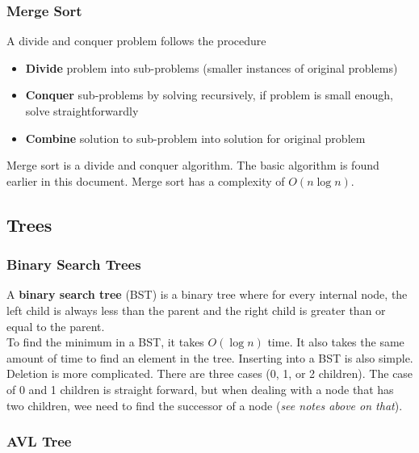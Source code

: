 \documentclass[]{article}
\begin{document}
\subsubsection{Merge Sort}\bigbreak

A divide and conquer problem follows the procedure

\begin{itemize}
	\item \textbf{Divide} problem into sub-problems (smaller instances of original problems)
	\item \textbf{Conquer} sub-problems by solving recursively, if problem is small enough, solve straightforwardly
	\item \textbf{Combine} solution to sub-problem into solution for original problem
\end{itemize}\bigbreak

Merge sort is a divide and conquer algorithm. The basic algorithm is found earlier in this document. Merge sort has a complexity of $O(n \log n).$\\


\subsection{Trees}\bigbreak

\subsubsection{Binary Search Trees}\bigbreak

A \textbf{binary search tree} (BST) is a binary tree where for every internal node, the left child is always less than the parent and the right child is greater than or equal to the parent.\\

To find the minimum in a BST, it takes $O(\log n)$ time. It also takes the same amount of time to find an element in the tree. Inserting into a BST is also simple. Deletion is more complicated. There are three cases (0, 1, or 2 children). The case of 0 and 1 children is straight forward, but when dealing with a node that has two children, wee need to find the successor of a node (\textit{see notes above on that}).\\

\subsubsection{AVL Tree}\bigbreak
\end{document}
